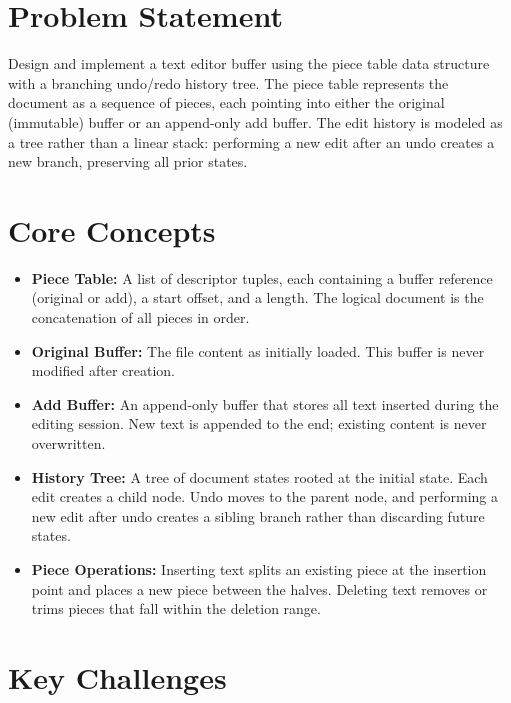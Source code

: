 \section{Problem Statement}

Design and implement a text editor buffer using the piece table data structure with a branching undo/redo history tree. The piece table represents the document as a sequence of pieces, each pointing into either the original (immutable) buffer or an append-only add buffer. The edit history is modeled as a tree rather than a linear stack: performing a new edit after an undo creates a new branch, preserving all prior states.

\section{Core Concepts}

\begin{itemize}
  \item \textbf{Piece Table:} A list of descriptor tuples, each containing a buffer reference (original or add), a start offset, and a length. The logical document is the concatenation of all pieces in order.
  \item \textbf{Original Buffer:} The file content as initially loaded. This buffer is never modified after creation.
  \item \textbf{Add Buffer:} An append-only buffer that stores all text inserted during the editing session. New text is appended to the end; existing content is never overwritten.
  \item \textbf{History Tree:} A tree of document states rooted at the initial state. Each edit creates a child node. Undo moves to the parent node, and performing a new edit after undo creates a sibling branch rather than discarding future states.
  \item \textbf{Piece Operations:} Inserting text splits an existing piece at the insertion point and places a new piece between the halves. Deleting text removes or trims pieces that fall within the deletion range.
\end{itemize}

\section{Key Challenges}

